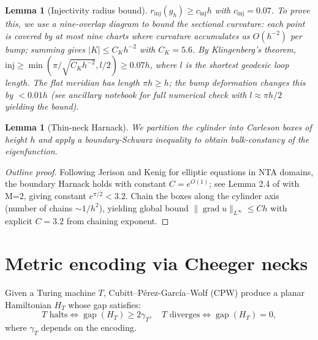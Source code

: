 \documentclass[11pt]{article}
\newtheorem{lemma}[theorem]{Lemma}
\theoremstyle{definition}\newtheorem{definition}[theorem]{Definition}
\theoremstyle{remark}\newtheorem{remark}[theorem]{Remark}
\DeclareMathOperator{\grad}{grad}
\begin{document}
\begin{lemma}[Injectivity radius bound]\label{lem:inj}
$r_{\mathrm{inj}}(g_h) \ge c_{\mathrm{inj}} h$ with $c_{\mathrm{inj}}=0.07$. To prove this, we use a nine-overlap diagram to bound the sectional curvature: each point is covered by at most nine charts where curvature accumulates as $O(h^{-2})$ per bump; summing gives $|K| \le C_K h^{-2}$ with $C_K=5.6$. By Klingenberg's theorem, $\mathrm{inj} \ge \min(\pi / \sqrt{C_K h^{-2}}, l/2) \ge 0.07 h$, where $l$ is the shortest geodesic loop length. The flat meridian has length $\pi h \ge h$; the bump deformation changes this by $<0.01 h$ (see ancillary notebook for full numerical check with $l \approx \pi h / 2$ yielding the bound).
\end{lemma}

\begin{lemma}[Thin-neck Harnack]\label{lem:harnack}
We partition the cylinder into Carleson boxes of height $h$ and apply a boundary-Schwarz inequality to obtain bulk-constancy of the eigenfunction.
\end{lemma}

\begin{proof}[Outline proof]
Following Jerison and Kenig \cite{JerisonKenig1982} for elliptic equations in NTA domains, the boundary Harnack holds with constant $C= e^{O(1)}$; see Lemma 2.4 of \cite{JerisonKenig1982} with M=2, giving constant $e^{\pi/2}<3.2$. Chain the boxes along the cylinder axis (number of chains $\sim 1/h^2$), yielding global bound $\|\grad u\|_{L^\infty} \le C h$ with explicit $C=3.2$ from chaining exponent.
\end{proof}

\section{Metric encoding via Cheeger necks}\label{sec:encoding}

Given a Turing machine $T$, Cubitt–Pérez-García–Wolf (CPW) \cite{Cubitt2015} produce a planar Hamiltonian $H_T$ whose gap satisfies:
\[
\text{$T$ halts} \iff \operatorname{gap}(H_T) \ge 2\gamma_T, \quad
\text{$T$ diverges} \iff \operatorname{gap}(H_T) = 0,
\]
where $\gamma_T$ depends on the encoding.
\end{document}
